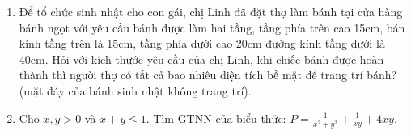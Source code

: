 \begin{ex}
{\begin{center}
		
	\end{center}
}
\end{ex}

\begin{ex} %
	\begin{enumerate}
		\item[a)] Để tổ chức sinh nhật cho con gái, chị Linh đã đặt thợ làm bánh tại cửa hàng bánh ngọt với yêu cầu bánh được làm hai tầng, tầng phía trên cao 15cm, bán kính tầng trên là 15cm, tầng phía dưới cao 20cm đường kính tầng dưới là 40cm. Hỏi với kích thước yêu cầu của chị Linh, khi chiếc bánh được hoàn thành thì người thợ có tất cả bao nhiêu diện tích bề mặt để trang trí bánh? (mặt đáy của bánh sinh nhật không trang trí).
		\item[b)] Cho $x, y > 0$ và $x+y \le 1$.
		Tìm GTNN của biểu thức: $P = \frac{1}{x^2+y^2} + \frac{1}{xy} + 4xy$.
	\end{enumerate}
\end{ex}

